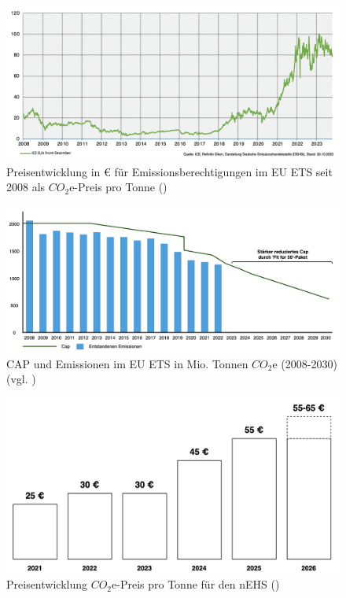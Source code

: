 \begin{figure}[ht]
	\centering
	\includegraphics[width=1.0\textwidth]{Bilder/price_co2_eu_ets.png} 
	\caption{Preisentwicklung in € für Emissionsberechtigungen im EU ETS seit 2008 als $CO_2$e-Preis pro Tonne (\cite{dehst.2023})}
	\label{fig:price_co2_eu_ets}
\end{figure}

\begin{figure}[ht]
	\centering
	\includegraphics[width=1.0\textwidth]{Bilder/cap_ets.png} 
	\caption{CAP und Emissionen im EU ETS in Mio. Tonnen $CO_2$e (2008-2030) (vgl. \cite{ub3.2023})}
	\label{fig:cap_ets}
\end{figure}

\begin{figure}[ht]
	\centering
	\includegraphics[width=1.0\textwidth]{Bilder/prices_nehs.png} 
	\caption{Preisentwicklung $CO_2$e-Preis pro Tonne für den nEHS (\cite{dehst.2023})}
	\label{fig:prices_nehs}
\end{figure}
